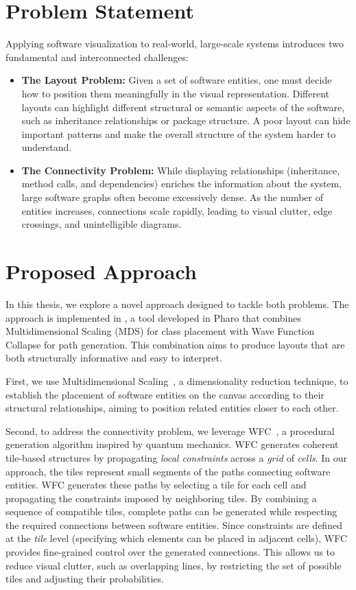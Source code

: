 \documentclass[../main.tex]{subfiles}
\begin{document}
\section{Problem Statement}
\label{sec-intro:problem_statement}
Applying software visualization to real-world, large-scale systems introduces two fundamental and interconnected challenges:

\begin{itemize}
    \item \textbf{The Layout Problem:} Given a set of software entities, one must decide how to position them meaningfully in the visual representation. Different layouts can highlight different structural or semantic aspects of the software, such as inheritance relationships or package structure. A poor layout can hide important patterns and make the overall structure of the system harder to understand.
    
    \item \textbf{The Connectivity Problem:} While displaying relationships (\eg inheritance, method calls, and dependencies)  enriches the information about the system, large software graphs often become excessively dense. As the number of entities increases, connections scale rapidly, leading to visual clutter, edge crossings, and unintelligible diagrams.
\end{itemize}

\section{Proposed Approach}
In this thesis, we explore a novel approach designed to tackle both problems. The approach is implemented in \wassis, a tool developed in Pharo that combines Multidimensional Scaling (MDS) for class placement with Wave Function Collapse for path generation. This combination aims to produce layouts that are both structurally informative and easy to interpret.

First, we use Multidimensional Scaling~, a dimensionality reduction technique, to establish the placement of software entities on the canvas according to their structural relationships, aiming to position related entities closer to each other.

Second, to address the connectivity problem, we leverage WFC~, a procedural generation algorithm inspired by quantum mechanics. WFC generates coherent tile-based structures by propagating \emph{local constraints} across a \emph{grid} of \emph{cells}. In our approach, the tiles represent small segments of the paths connecting software entities. WFC generates these paths by selecting a tile for each cell and propagating the constraints imposed by neighboring tiles. By combining a sequence of compatible tiles, complete paths can be generated while respecting the required connections between software entities. Since constraints are defined at the \emph{tile} level (\ie specifying which elements can be placed in adjacent cells), WFC provides fine-grained control over the generated connections. This allows us to reduce visual clutter, such as overlapping lines, by restricting the set of possible tiles and adjusting their probabilities.
\end{document}
